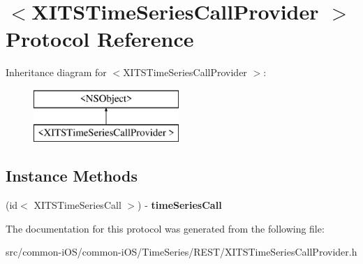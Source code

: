 \hypertarget{protocol_x_i_t_s_time_series_call_provider_01-p}{}\section{$<$X\+I\+T\+S\+Time\+Series\+Call\+Provider $>$ Protocol Reference}
\label{protocol_x_i_t_s_time_series_call_provider_01-p}
Inheritance diagram for $<$X\+I\+T\+S\+Time\+Series\+Call\+Provider $>$\+:\begin{figure}[H]
\begin{center}
\leavevmode
\includegraphics[height=2.000000cm]{protocol_x_i_t_s_time_series_call_provider_01-p}
\end{center}
\end{figure}
\subsection*{Instance Methods}
\begin{DoxyCompactItemize}
\item 
\hypertarget{protocol_x_i_t_s_time_series_call_provider_01-p_a10e8e77201e32badaf5854a401d2c056}{}\label{protocol_x_i_t_s_time_series_call_provider_01-p_a10e8e77201e32badaf5854a401d2c056} 
(id$<$ X\+I\+T\+S\+Time\+Series\+Call $>$) -\/ {\bfseries time\+Series\+Call}
\end{DoxyCompactItemize}


The documentation for this protocol was generated from the following file\+:\begin{DoxyCompactItemize}
\item 
src/common-\/i\+O\+S/common-\/i\+O\+S/\+Time\+Series/\+R\+E\+S\+T/X\+I\+T\+S\+Time\+Series\+Call\+Provider.\+h\end{DoxyCompactItemize}
